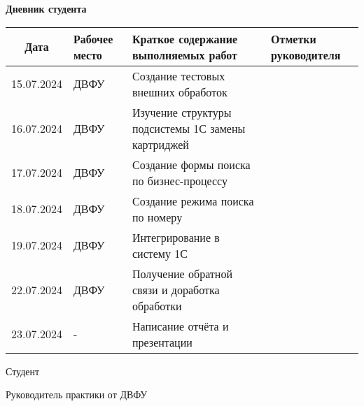 \begin{center}
    \textbf{Дневник студента}

    \begin{tabular}{|c|m{1.7cm}|m{9cm}|m{3cm}|}
        \hline
        Дата & Рабочее место & Краткое содержание выполняемых работ & Отметки руководителя \\
        \hline
        15.07.2024 & ДВФУ & Создание тестовых внешних обработок &  \\
        \hline
        16.07.2024 & ДВФУ & Изучение структуры подсистемы 1С замены картриджей &  \\
        \hline
        17.07.2024 & ДВФУ & Создание формы поиска по бизнес-процессу &  \\
        \hline
        18.07.2024 & ДВФУ & Создание режима поиска по номеру &  \\
        \hline
        19.07.2024 & ДВФУ & Интегрирование в систему 1С &  \\
        \hline
        22.07.2024 & ДВФУ & Получение обратной связи и доработка обработки &  \\
        \hline
        23.07.2024 & - & Написание отчёта и презентации &  \\
        \hline
    \end{tabular}
\end{center}

\vspace{10pt}

\begin{multicols}{2}

    Студент

    Руководитель практики от ДВФУ

    \columnbreak

    \hspace*{-1cm} 

    \hspace*{-1cm} 


\end{multicols}


\pagebreak